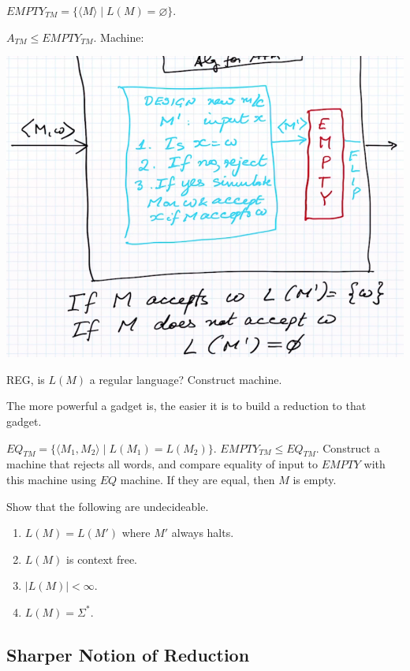 \documentclass[../598comp.tex]{subfiles}
\begin{document}
$EMPTY_{TM} = \{\langle M \rangle \mid L(M) = \varnothing\}$.

$A_{TM} \leq EMPTY_{TM}$. Machine:

\includegraphics[width=\textwidth]{algorithm_for_empty}

REG, is $L(M)$ a regular language? Construct machine. %

\begin{note}
  The more powerful a gadget is, the easier it is to build a reduction to that gadget.
\end{note}

$EQ_{TM} = \{\langle M_1, M_2 \rangle \mid L(M_1) = L(M_2)\}$. $EMPTY_{TM} \leq
EQ_{TM}$. Construct a machine that rejects all words, and compare equality of
input to $EMPTY$ with this machine using $EQ$ machine. If they are equal, then
$M$ is empty.

\begin{exercise}
  Show that the following are undecideable.
  \begin{enumerate}
  \item 
    $L(M) = L(M')$ where $M'$ always halts.
  \item
    $L(M)$ is context free.
  \item
    $|L(M)| < \infty$. 
  \item
    $L(M) = \Sigma^*$.
  \end{enumerate}
\end{exercise}

\subsection{Sharper Notion of Reduction}
\end{document}

